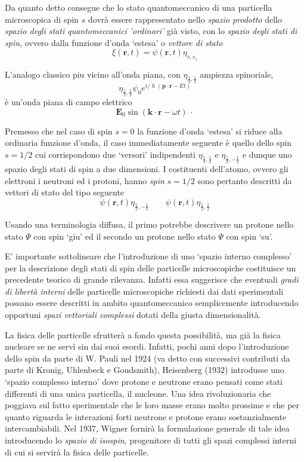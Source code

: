 Da quanto detto consegue che lo stato quantomeccanico di una particella microscopica di spin $s$ dovrà essere rappresentato nello \emph{spazio prodotto} dello \emph{spazio degli stati quantomeccanici 'ordinari’} già visto, con lo \emph{spazio degli stati di spin}, ovvero dalla funzione d’onda ‘estesa’ o \emph{vettore di stato}
\[
\xi(\mathbf{r},t) = \psi(\mathbf{r},t) \eta_{s,s_{z}}
\]
\begin{marginfigure}
    L'analogo classico piu vicino all'onda piana, con
    \(\eta_{\frac{1}{2}, \frac{1}{2}}\) ampiezza spinoriale,
    \[
        \eta_{\frac{1}{2}, \frac{1}{2}} \psi_{0}e^{ i/\hslash (\bm{p}\cdot \bm{r} - Et)}
    \] è un'onda piana di campo elettrico
    \[
        \bm{E}_{0} \sin(\bm{k}\cdot \bm{r} - \omega t) \, \cdot
    \]
\end{marginfigure}
Premesso che nel caso di spin $s=0$ la funzione d’onda ‘estesa’ si riduce alla ordinaria funzione d’onda, il caso immediatamente seguente è quello dello spin $s=1 / 2$ cui corrispondono due ‘versori’ indipendenti $\eta_{\frac{1}{2}, \frac{1}{2}}$ e $\eta_{\frac{1}{2}, - \frac{1}{2}}$ e dunque uno spazio degli stati di spin a due dimensioni. I costituenti dell’atomo, ovvero gli elettroni i neutroni ed i protoni, hanno \emph{spin} $s=1/2$ sono pertanto descritti da vettori di stato del tipo seguente
\[
\psi(\mathbf{r},t) \eta_{\frac{1}{2}, - \frac{1}{2}} \qquad \psi(\mathbf{r},t) \eta_{\frac{1}{2}, \frac{1}{2}}
\]

Usando una terminologia diffusa, il primo potrebbe descrivere un protone nello stato $\Psi$ con spin ‘giu’ ed il secondo un protone nello stato $\Psi$ con spin ‘su’.
\bigskip

E’ importante sottolineare che l’introduzione di uno ‘spazio interno complesso’ per la descrizione degli stati di spin delle particelle microscopiche costituisce un precedente teorico di grande rilevanza.
Infatti essa suggerisce che eventuali \emph{gradi di libertà interni} delle particelle microscopiche richiesti dai dati sperimentali possano essere descritti in ambito quantomeccanico semplicemente introducendo opportuni \emph{spazi vettoriali complessi} dotati della giusta dimensionalità.

La fisica delle particelle sfrutterà a fondo questa possibilità, ma già la fisica nucleare se ne servì sin dai suoi esordi.
Infatti, pochi anni dopo l’introduzione dello spin da parte di W. Pauli nel 1924 (va detto con successivi contributi da parte di Kronig, Uhlenbeck e Goudsmith), Heisenberg (1932) introdusse uno ‘spazio complesso interno’ dove protone e neutrone erano pensati come stati differenti di una unica particella, il nucleone.
Una idea rivoluzionaria che poggiava sul fatto sperimentale che le loro masse erano molto prossime e che per quanto riguarda le interazioni forti neutrone e protone erano sostanzialmente intercambiabili.
Nel 1937, Wigner fornirà la formulazione generale di tale idea introducendo lo \emph{spazio di isospin}, progenitore di tutti gli spazi complessi interni di cui si servirà la fisica delle particelle.
\bigskip

